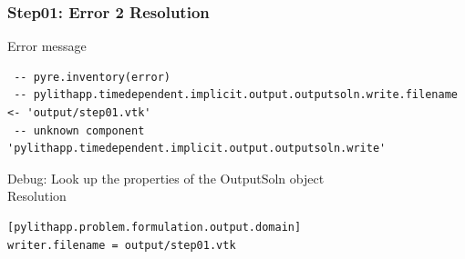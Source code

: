 \documentclass[aspectration=169]{beamer}
\newcommand{\errlabel}[1]{{\small \color{blue}#1}}
\newcommand{\debuginfo}[1]{{\small \color{green}#1}}
\begin{document}
\begin{frame}[fragile]
  \frametitle{Step01: Error 2 Resolution}

\errlabel{Error message}
\begin{lstlisting}
 -- pyre.inventory(error)
 -- pylithapp.timedependent.implicit.output.outputsoln.write.filename <- 'output/step01.vtk'
 -- unknown component 'pylithapp.timedependent.implicit.output.outputsoln.write'
\end{lstlisting}\pause
\errlabel{Debug:} \debuginfo{Look up the properties of the OutputSoln object}\pause\\
\errlabel{Resolution}
\begin{lstlisting}
[pylithapp.problem.formulation.output.domain]
writer.filename = output/step01.vtk
\end{lstlisting}
  
\end{frame}
\end{document}
